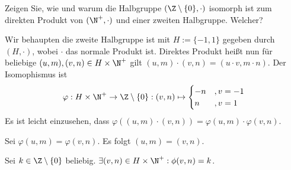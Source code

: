 \begin{exercise}
    Zeigen Sie, wie und warum die Halbgruppe $(\Z \setminus \{0\}, \cdot)$ isomorph ist zum direkten Produkt von $(\N^+, \cdot)$ und einer zweiten Halbgruppe. Welcher?
\end{exercise}
\begin{solution}
    Wir behaupten die zweite Halbgruppe ist mit $H := \{-1, 1\}$ gegeben durch $(H, \cdot)$, wobei $\cdot$ das normale Produkt ist. Direktes Produkt heißt nun für beliebige $(u, m), (v, n) \in H \times \N^+$ gilt $(u, m) \cdot (v, n) = (u \cdot v, m \cdot n)$. Der Isomophismus ist
    \begin{align*}
        \varphi: H \times \N^+ \to \Z \setminus \{0\}: (v, n) \mapsto 
        \begin{cases}
            -n &, v = -1 \\
            n &, v = 1
        \end{cases}
    \end{align*} 
    Es ist leicht einzusehen, dass $\varphi((u,m) \cdot (v, n)) = \varphi(u, m) \cdot \varphi(v, n)$. 

    Sei $\varphi(u, m) = \varphi(v, n)$. Es folgt $(u, m) = (v, n)$. 

    Sei $k \in \Z \setminus \{0\}$ beliebig. $\exists (v, n) \in H \times \N^+: \phi(v, n) = k$. 
\end{solution}